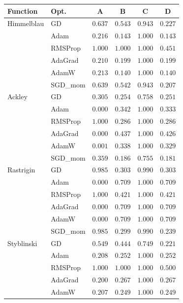 \documentclass[11pt]{article}
\begin{document}
\begin{center}
\small
\begin{tabular}{llcccc}
\toprule
Function & Opt. & A & B & C & D \\
\midrule
Himmelblau & GD      & $0.637$ & $0.543$ & $0.943$ & $0.227$ \\
           & Adam    & $0.216$ & $0.143$ & $1.000$ & $0.143$ \\
           & RMSProp & $1.000$ & $1.000$ & $1.000$ & $0.451$ \\
           & AdaGrad & $0.210$ & $0.199$ & $1.000$ & $0.199$ \\
           & AdamW   & $0.213$ & $0.140$ & $1.000$ & $0.140$ \\
           & SGD\_mom& $0.639$ & $0.542$ & $0.943$ & $0.207$ \\
\midrule
Ackley     & GD      & $0.305$ & $0.254$ & $0.758$ & $0.251$ \\
           & Adam    & $0.000$ & $0.342$ & $1.000$ & $0.333$ \\
           & RMSProp & $1.000$ & $0.286$ & $1.000$ & $0.286$ \\
           & AdaGrad & $0.000$ & $0.437$ & $1.000$ & $0.426$ \\
           & AdamW   & $0.001$ & $0.338$ & $1.000$ & $0.329$ \\
           & SGD\_mom& $0.359$ & $0.186$ & $0.755$ & $0.181$ \\
\midrule
Rastrigin  & GD      & $0.985$ & $0.303$ & $0.990$ & $0.303$ \\
           & Adam    & $0.000$ & $0.709$ & $1.000$ & $0.709$ \\
           & RMSProp & $1.000$ & $0.421$ & $1.000$ & $0.421$ \\
           & AdaGrad & $0.000$ & $0.709$ & $1.000$ & $0.709$ \\
           & AdamW   & $0.000$ & $0.709$ & $1.000$ & $0.709$ \\
           & SGD\_mom& $0.985$ & $0.299$ & $0.990$ & $0.239$ \\
\midrule
Styblinski & GD      & $0.549$ & $0.444$ & $0.749$ & $0.221$ \\
           & Adam    & $0.208$ & $0.252$ & $1.000$ & $0.252$ \\
           & RMSProp & $1.000$ & $1.000$ & $1.000$ & $0.500$ \\
           & AdaGrad & $0.200$ & $0.267$ & $1.000$ & $0.267$ \\
           & AdamW   & $0.207$ & $0.249$ & $1.000$ & $0.249$ \\

\end{tabular}
\end{center}
\end{document}
